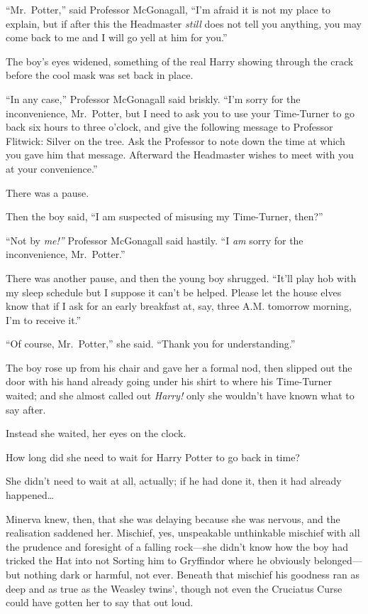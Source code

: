``Mr.~Potter,'' said Professor McGonagall, ``I'm afraid it is not my
place to explain, but if after this the Headmaster \emph{still} does not
tell you anything, you may come back to me and I will go yell at him for
you.''

The boy's eyes widened, something of the real Harry showing through the
crack before the cool mask was set back in place.

``In any case,'' Professor McGonagall said briskly. ``I'm sorry for the
inconvenience, Mr.~Potter, but I need to ask you to use your Time-Turner
to go back six hours to three o'clock, and give the following message to
Professor Flitwick: Silver on the tree. Ask the Professor to note down
the time at which you gave him that message. Afterward the Headmaster
wishes to meet with you at your convenience.''

There was a pause.

Then the boy said, ``I am suspected of misusing my Time-Turner, then?''

``Not by \emph{me!''} Professor McGonagall said hastily. ``I \emph{am}
sorry for the inconvenience, Mr.~Potter.''

There was another pause, and then the young boy shrugged. ``It'll play
hob with my sleep schedule but I suppose it can't be helped. Please let
the house elves know that if I ask for an early breakfast at, say, three
A.M. tomorrow morning, I'm to receive it.''

``Of course, Mr.~Potter,'' she said. ``Thank you for understanding.''

The boy rose up from his chair and gave her a formal nod, then slipped
out the door with his hand already going under his shirt to where his
Time-Turner waited; and she almost called out \emph{Harry!} only she
wouldn't have known what to say after.

Instead she waited, her eyes on the clock.

How long did she need to wait for Harry Potter to go back in time?

She didn't need to wait at all, actually; if he had done it, then it had
already happened\ldots{}

Minerva knew, then, that she was delaying because she was nervous, and
the realisation saddened her. Mischief, yes, unspeakable unthinkable
mischief with all the prudence and foresight of a falling rock---she
didn't know how the boy had tricked the Hat into not Sorting him to
Gryffindor where he obviously belonged---but nothing dark or harmful,
not ever. Beneath that mischief his goodness ran as deep and as true as
the Weasley twins', though not even the Cruciatus Curse could have
gotten her to say that out loud.

